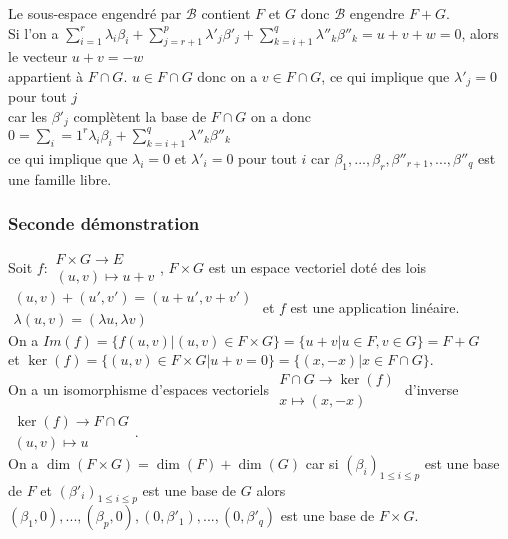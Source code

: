 \documentclass[a4paper,10pt]{book} %
\newcommand{\B}{\mathcal{B}}
\begin{document}
Le sous-espace engendré par $\B$ contient $F$ et $G$ donc $\B$ engendre $F+G$.\\

Si l'on a $\displaystyle \sum\limits_{i=1}^r\lambda_i\beta_i+\sum\limits_{j=r+1}^p\lambda'_j\beta'_j+ \sum\limits_{k=i+1}^q\lambda''_k\beta''_k=u+v+w=0$, alors le vecteur $u+v=-w$\\
appartient à $F\cap G$. $u\in F\cap G$ donc on a $v\in F\cap G$, ce qui implique que $\lambda'_j=0$ pour tout $j$\\
 car les $\beta'_j$ complètent la base de $F\cap G$ on a donc $\displaystyle 0=\sum\limits_i=1^r\lambda_i\beta_i+ \sum\limits_{k=i+1}^q\lambda''_k\beta''_k$\\
ce qui implique que $\lambda_i=0$ et $\lambda'_i=0$ pour tout $i$ car $\beta_1,...,\beta_r,\beta''_{r+1},...,\beta''_{q}$ est une famille libre.\\

\subsubsection{Seconde démonstration}
Soit $f:\begin{matrix}F\times G\rightarrow E \\ (u,v)\mapsto u+v\end{matrix}$, $F\times G$ est un espace vectoriel doté des lois $\begin{matrix} (u,v)+(u',v')=(u+u',v+v')\\ \lambda (u,v)=(\lambda u, \lambda v)\end{matrix}$ et $f$ est une application linéaire.\\

On a $Im(f)=\{f(u,v) | (u,v)\in F\times G \}=\{ u+v|u\in F, v\in G \}=F+G$ \\
et $\ker(f)=\{(u,v)\in F\times G | u+v=0 \}=\{(x,-x) | x\in F\cap G \}$.\\

On a un isomorphisme d'espaces vectoriels $\begin{matrix}F\cap G \rightarrow \ker(f) \\ x\mapsto (x,-x)\end{matrix}$
d'inverse $\begin{matrix}\ker(f)\rightarrow F\cap G\\(u,v)\mapsto u\end{matrix}$.\\

On a $\dim(F\times G)=\dim(F)+\dim(G)$ car si $(\beta_i)_{1\leq i\leq p}$ est une base de $F$ et $(\beta'_i)_{1\leq i\leq p}$ est une base de $G$ alors $(\beta_1,0),...,(\beta_p,0),(0,\beta'_1),...,(0,\beta'_q)$ est une base de $F\times G$.\\
\end{document}
